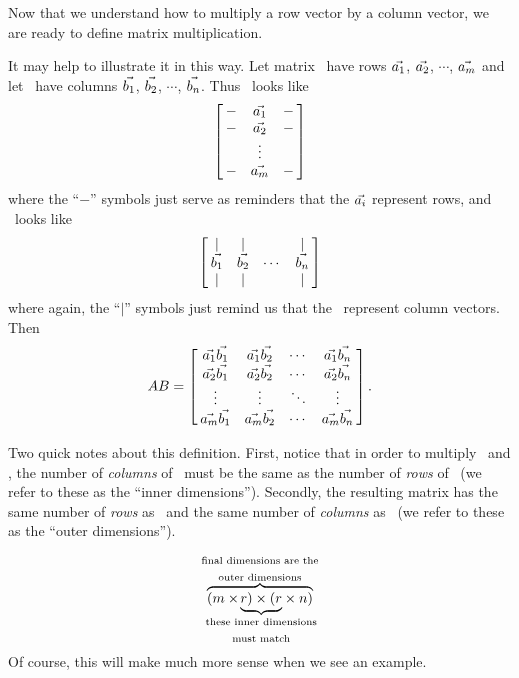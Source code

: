 Now that we understand how to multiply a row vector by a column vector, we are ready to define matrix multiplication. 


It may help to illustrate it in this way. Let matrix \tta\ have rows $\vect{a_1}$, $\vect{a_2}$, $\cdots$, $\vect{a_m}$ and let \ttb\ have columns  $\vect{b_1}$, $\vect{b_2}$, $\cdots$, $\vect{b_n}$. Thus \tta\ looks like $$\bmx{ccc}-&\vect{a_1}&-\\-&\vect{a_2}&-\\ & \vdots & \\ -&\vect{a_m}&-\emx$$ where the ``$-$'' symbols just serve as reminders that the $\vect{a_i}$ represent rows, and \ttb\ looks like $$\bmx{cccc}|&|& &|\\\vect{b_1}&\vect{b_2}&\cdots&\vect{b_n}\\|&|& &|\emx$$ where again, the ``$|$'' symbols just remind us that the \ represent column vectors. Then $$\tta\ttb = \bmx{cccc}\vect{a_1}\vect{b_1} & \vect{a_1}\vect{b_2} & \cdots & \vect{a_1}\vect{b_n}\\ \vect{a_2}\vect{b_1} & \vect{a_2}\vect{b_2} & \cdots & \vect{a_2}\vect{b_n}\\ \vdots & \vdots & \ddots & \vdots \\ \vect{a_m}\vect{b_1} & \vect{a_m}\vect{b_2} & \cdots & \vect{a_m}\vect{b_n}\emx.$$

Two quick notes about this definition. First, notice that in order to multiply \tta\ and \ttb, the number of \textit{columns} of \tta\ must be the same as the number of \textit{rows} of \ttb\ (we refer to these as the ``inner dimensions''). Secondly, the resulting matrix has the same number of \textit{rows} as \tta\ and the same number of \textit{columns} as \ttb\ (we refer to these as the ``outer dimensions'').

$$\overbrace{(m\times {\hskip -28pt}\underbrace{r) \times (r}_\text{\parbox{80pt}{\centering these inner dimensions must match}}{\hskip -27pt}\times n)}^\text{\parbox{90pt}{\centering final dimensions are the outer dimensions}}$$
Of course, this will make much more sense when we see an example. \\

